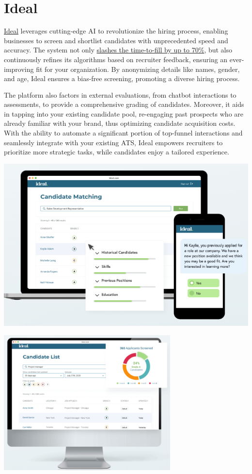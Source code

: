 \documentclass[
]{book}
\begin{document}
\hypertarget{ideal}{%
\section{Ideal}\label{ideal}}

\href{https://ideal.com/}{Ideal} leverages cutting-edge AI to revolutionize the hiring process, enabling businesses to screen and shortlist candidates with unprecedented speed and accuracy. The system not only \href{https://ideal.com/product/recruiting-chatbot/}{slashes the time-to-fill by up to 70\%}, but also continuously refines its algorithms based on recruiter feedback, ensuring an ever-improving fit for your organization. By anonymizing details like names, gender, and age, Ideal ensures a bias-free screening, promoting a diverse hiring process.

The platform also factors in external evaluations, from chatbot interactions to assessments, to provide a comprehensive grading of candidates. Moreover, it aids in tapping into your existing candidate pool, re-engaging past prospects who are already familiar with your brand, thus optimizing candidate acquisition costs. With the ability to automate a significant portion of top-funnel interactions and seamlessly integrate with your existing ATS, Ideal empowers recruiters to prioritize more strategic tasks, while candidates enjoy a tailored experience.

\includegraphics[width=5.46875in,height=\textheight]{ideal pic 1.png}

\includegraphics[width=3.57292in,height=\textheight]{ideal pic 2.png}
\end{document}
